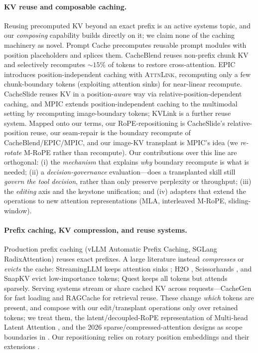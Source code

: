 \paragraph{KV reuse and composable caching.} Reusing precomputed KV beyond an exact prefix is an active
systems topic, and our \emph{composing} capability builds directly on it; we claim none of the caching
machinery as novel. Prompt Cache \citep{gim2024promptcache} precomputes reusable prompt modules with
position placeholders and splices them. CacheBlend \citep{yao2025cacheblend} reuses non-prefix chunk KV
and selectively recomputes ${\sim}15\%$ of tokens to restore cross-attention. EPIC
\citep{hu2025epic} introduces position-independent caching with \textsc{AttnLink}, recomputing only a few
chunk-boundary tokens (exploiting attention sinks) for near-linear recompute. CacheSlide
\citep{liu2026cacheslide} reuses KV in a position-\emph{aware} way via relative-position-dependent caching,
and MPIC \citep{mpic2025} extends position-independent caching to the multimodal setting by recomputing
image-boundary tokens; KVLink \citep{yang2025kvlink} is a further reuse system. Mapped onto our terms, our
RoPE-repositioning is CacheSlide's relative-position reuse, our seam-repair is the boundary recompute of
CacheBlend/EPIC/MPIC, and our image-KV transplant is MPIC's idea (we \emph{re-rotate} M-RoPE rather than
recompute). Our contributions over this line are orthogonal: (i) the \emph{mechanism} that explains
\emph{why} boundary recompute is what is needed; (ii) a \emph{decision-governance} evaluation---does a
transplanted skill still \emph{govern the tool decision}, rather than only preserve perplexity or
throughput; (iii) the \emph{editing} axis and the keystone unification; and (iv) adapters that extend the
operations to new attention representations (MLA, interleaved M-RoPE, sliding-window).

\paragraph{Prefix caching, KV compression, and reuse systems.} Production prefix caching (vLLM Automatic
Prefix Caching, SGLang RadixAttention) reuses exact prefixes. A large literature instead \emph{compresses}
or \emph{evicts} the cache: StreamingLLM keeps attention sinks \citep{xiao2024streamingllm}; H2O
\citep{zhang2023h2o}, Scissorhands \citep{liu2023scissorhands}, and SnapKV \citep{li2024snapkv} evict
low-importance tokens; Quest \citep{tang2024quest} keeps all tokens but attends sparsely. Serving systems
stream or share cached KV across requests---CacheGen \citep{liu2024cachegen} for fast loading and RAGCache
\citep{jin2024ragcache} for retrieval reuse. These change \emph{which} tokens are present, and compose with
our edit/transplant operations only over retained tokens; we treat them, the latent/decoupled-RoPE
representation of Multi-head Latent Attention \citep{deepseekv2,deepseekv3}, and the 2026
sparse/compressed-attention designs as scope boundaries in . Our repositioning relies on
rotary position embeddings \citep{su2024rope} and their extensions \citep{peng2024yarn}.


